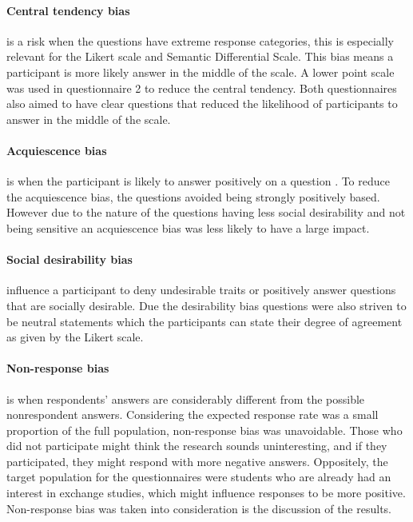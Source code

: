 \paragraph{Central tendency bias} is a risk when the questions have extreme response categories, this is especially relevant for the Likert scale and Semantic Differential Scale. This bias means a participant is more likely answer in the middle of the scale. A lower point scale was used in questionnaire 2 to reduce the central tendency. Both questionnaires also aimed to have clear questions that reduced the likelihood of participants to answer in the middle of the scale.

\paragraph{Acquiescence bias} is when the participant is likely to answer positively on a question \cite{cronbach1946response}. To reduce the acquiescence bias, the questions avoided being strongly positively based. However due to the nature of the questions having less social desirability and not being sensitive an acquiescence bias was less likely to have a large impact. 

\paragraph{Social desirability bias} influence a participant to deny undesirable traits or positively answer questions that are socially desirable. Due the desirability bias questions were also striven to be neutral statements which the participants can state their degree of agreement as given by the Likert scale. 

\paragraph{Non-response bias} is when respondents' answers are considerably different from the possible nonrespondent answers. Considering the expected response rate was a small proportion of the full population, non-response bias was unavoidable. Those who did not participate might think the research sounds uninteresting, and if they participated, they might respond with more negative answers. Oppositely, the target population for the questionnaires were students who are already had an interest in exchange studies, which might influence responses to be more positive. Non-response bias was taken into consideration is the discussion of the results.



